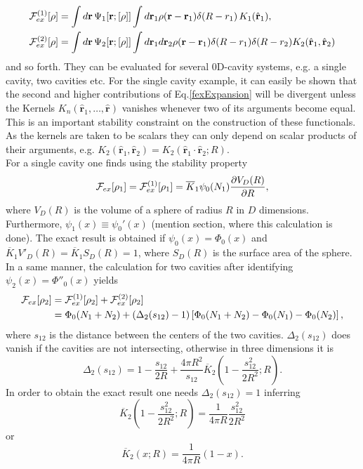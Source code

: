 \documentclass{article}
\begin{document}
\begin{align}\label{fexExpansion}
	{\cal F}^{(1)}_{ex}[\rho] &= \int d\mathbf{r}\,\Psi_1[\mathbf{r};[\rho]]\int d\mathbf{r}_1 \rho(\mathbf{r}-\mathbf{r}_1)\delta(R-r_1)\,K_1(\hat{\mathbf{r}}_1),\\\nonumber
	{\cal F}^{(2)}_{ex}[\rho] &= \int d\mathbf{r}\,\Psi_2[\mathbf{r};[\rho]]\int d\mathbf{r}_1 d\mathbf{r}_2 \rho(\mathbf{r}-\mathbf{r}_1)\delta(R-r_1)\delta(R-r_2)K_2(\hat{\mathbf{r}}_1,\hat{\mathbf{r}}_2)
\end{align}
and so forth. They can be evaluated for several 0D-cavity systems, e.g. a single cavity, two cavities etc. For the single cavity example, it can easily be shown that the second and higher contributions of Eq.\eqref{fexExpansion} will be divergent unless the Kernels $K_n(\hat{\mathbf{r}}_1,\dots,\hat{\mathbf{r}})$ vanishes whenever two of its arguments become equal. This is an important stability constraint on the construction of these functionals. As the kernels are taken to be scalars they can only depend on scalar products of their arguments, e.g. $K_2(\hat{\mathbf{r}}_1,\hat{\mathbf{r}}_2)=K_2(\hat{\mathbf{r}}_1\cdot \hat{\mathbf{r}}_2;R).$\\
For a single cavity one finds using the stability property
\begin{equation}
	{\cal F}_{ex}[\rho_1] = {\cal F}^{(1)}_{ex}[\rho_1] = \overline{K}_1\psi_0(N_1)\frac{\partial V_D(R)}{\partial R},
\end{equation}
where $V_D(R)$ is the volume of a sphere of radius $R$ in $D$ dimensions. Furthermore, $\psi_1(x)\equiv \psi_0'(x)$ (mention section, where this calculation is done). The exact result is obtained if $\psi_0(x)=\Phi_0(x)$ and $\overline{K}_1V'_D(R)=\overline{K}_1 S_D(R) = 1$, where $S_D(R)$ is the surface area of the sphere.\\
In a same manner, the calculation for two cavities after identifying $\psi_2(x)=\Phi''_0(x)$ yields
\begin{align}
	{\cal F}_{ex}[\rho_2] &= {\cal F}^{(1)}_{ex}[\rho_2]+{\cal F}^{(2)}_{ex}[\rho_2]\\\nonumber
	&=\Phi_0(N_1+N_2)+(\Delta_2(s_{12})-1)\left[\Phi_0(N_1+N_2)-\Phi_0(N_1)-\Phi_0(N_2)\right], 
\end{align}
where $s_{12}$ is the distance between the centers of the two cavities.
$\Delta_2(s_{12})$ does vanish if the cavities are not intersecting, otherwise in three dimensions it is
\begin{equation}
\Delta_2(s_{12}) = 1-\frac{s_{12}}{2R}+\frac{4\pi R^2}{s_{12}}\overline{K}_2\left(1-\frac{s^2_{12}}{2R^2};R\right).	
\end{equation}
In order to obtain the exact result one needs $\Delta_2(s_{12})=1$ inferring
\begin{equation}
	\overline{K}_2\left(1-\frac{s^2_{12}}{2R^2};R\right)=\frac{1}{4\pi R}\frac{s^2_{12}}{2R^2}
\end{equation}
or 
\begin{equation}
	\overline{K}_2(x;R) = \frac{1}{4\pi R}(1-x).
\end{equation} 
\end{document}
